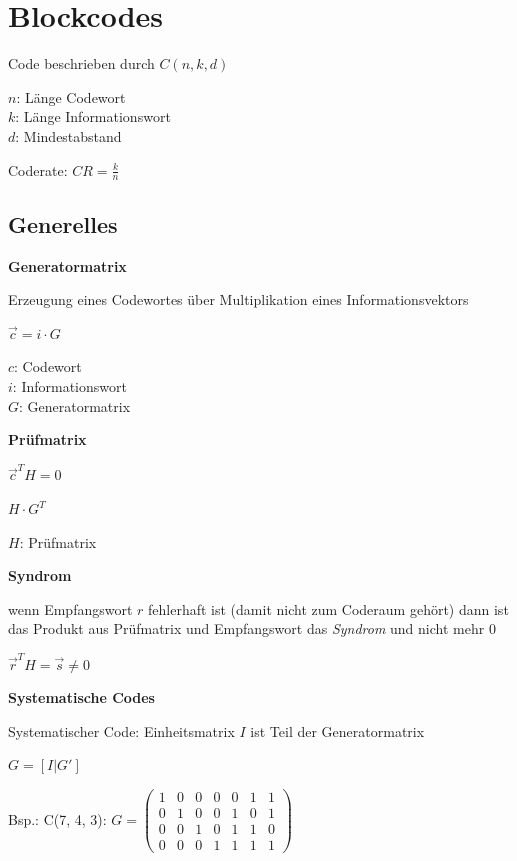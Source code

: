 \section{Blockcodes}

Code beschrieben durch $C(n, k, d)$

$n$: Länge Codewort\\
$k$: Länge Informationswort\\
$d$: Mindestabstand

Coderate: 
$\displaystyle{
    CR = \frac{k}{n}
}$

\subsection{Generelles}

\textbf{Generatormatrix}

Erzeugung eines Codewortes über Multiplikation eines Informationsvektors

$\displaystyle{
    \vec{c} = i \cdot G
}$

$c$: Codewort\\
$i$: Informationswort\\
$G$: Generatormatrix

\textbf{Prüfmatrix}

$\displaystyle{
    \vec{c}^T  H = 0
}$

$\displaystyle{
    H \cdot G^T
}$

$H$: Prüfmatrix

\textbf{Syndrom}

wenn Empfangswort $r$ fehlerhaft ist (damit nicht zum Coderaum gehört) dann ist das Produkt aus
Prüfmatrix und Empfangswort das \textit{Syndrom} und nicht mehr 0

$\displaystyle{
    \vec{r}^T  H = \vec{s} \neq 0
}$

\textbf{Systematische Codes}

Systematischer Code: Einheitsmatrix $I$ ist Teil der Generatormatrix

$\displaystyle{
    G = [I | G']
}$

Bsp.: C(7, 4, 3): 
$\displaystyle{
    G =
    \begin{pmatrix}
        1 & 0 & 0 & 0 & 0 & 1 & 1\\
        0 & 1 & 0 & 0 & 1 & 0 & 1\\
        0 & 0 & 1 & 0 & 1 & 1 & 0\\
        0 & 0 & 0 & 1 & 1 & 1 & 1
    \end{pmatrix}
}$

